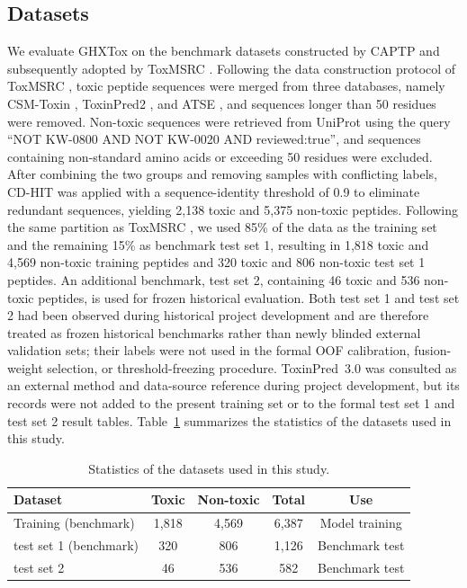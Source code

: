 \documentclass[12pt]{article}
\newcommand{\ghxheader}{}
\begin{document}
\subsection{Datasets}
We evaluate GHXTox on the benchmark datasets constructed by CAPTP \cite{jiao2024captp} and
subsequently adopted by ToxMSRC \cite{zhang2025toxmsrc}. Following the data construction protocol
of ToxMSRC \cite{zhang2025toxmsrc}, toxic peptide sequences were merged from three databases,
namely CSM-Toxin \cite{morozov2023csmboxin}, ToxinPred2 \cite{sharma2022toxinpred2}, and ATSE \cite{wei2021atse}, and sequences longer
than 50 residues were removed. Non-toxic sequences were retrieved from UniProt
\cite{uniprot2019} using the query ``NOT KW-0800 AND NOT KW-0020 AND reviewed:true'', and
sequences containing non-standard amino acids or exceeding 50 residues were
excluded. After combining the two groups and removing samples with conflicting
labels, CD-HIT \cite{fu2012cdhit} was applied with a sequence-identity threshold of 0.9 to
eliminate redundant sequences, yielding 2{,}138 toxic and 5{,}375 non-toxic
peptides. Following the same partition as ToxMSRC \cite{zhang2025toxmsrc}, we used 85\% of the data
as the training set and the remaining 15\% as benchmark test set 1,
resulting in 1{,}818 toxic and
4{,}569 non-toxic training peptides and 320 toxic and 806 non-toxic test set 1
peptides. An additional benchmark, test set 2, containing 46 toxic and 536
non-toxic peptides, is used for frozen historical evaluation. Both test set 1 and
test set 2 had been observed during historical project development and are
therefore treated as frozen historical benchmarks rather than newly blinded
external validation sets; their labels were not used in the formal OOF
calibration, fusion-weight selection, or threshold-freezing procedure.
ToxinPred~3.0 \cite{rathore2024toxinpred3} was consulted as an external method
and data-source reference during project development, but its records were not
added to the present training set or to the formal test set 1 and test set 2 result tables.
Table~\ref{tab:datasets} summarizes the statistics of the datasets used in
this study.

\begin{table}[htbp]
    \centering
    \caption{Statistics of the datasets used in this study.}
    \label{tab:datasets}
    \begin{tabular}{lcccc}
        \toprule
        \ghxheader Dataset & Toxic & Non-toxic & Total & Use \\
        \midrule
        Training (benchmark) & 1,818 & 4,569 & 6,387 & Model training \\
        test set 1 (benchmark)    &   320 &   806 & 1,126 & Benchmark test \\
        test set 2                &    46 &   536 &   582 & Benchmark test \\
        \bottomrule
    \end{tabular}
\end{table}
\end{document}

